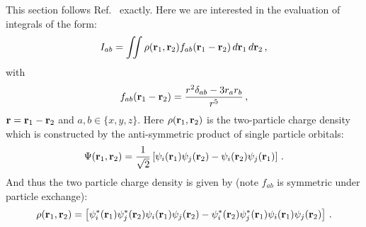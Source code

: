 This section follows Ref.~\cite{rayson2008first} exactly. Here we are interested in the evaluation of integrals of the form:
\begin{align}
    I_{ab}=\iint\rho(\mathbf{r}_1,\mathbf{r}_2)f_{ab}(\mathbf{r}_1-\mathbf{r}_2)\, d\mathbf{r}_1\, d\mathbf{r}_2 \, ,
    \label{zfs:eq:8}
\end{align}
with
\begin{align}
    f_{ab}(\mathbf{r}_1-\mathbf{r}_2)=\frac{r^2\delta_{ab}-3r_ar_b}{r^5} \, ,
    \label{zfs:eq:9}
\end{align}
$\mathbf{r}=\mathbf{r}_1-\mathbf{r}_2$ and $a,b \in \{x,y,z\}$. Here $\rho(\mathbf{r}_1,\mathbf{r}_2)$ is the two-particle charge density which is constructed by the anti-symmetric product of single particle orbitals:
\begin{align}
    \Psi(\mathbf{r}_1,\mathbf{r}_2)=\frac{1}{\sqrt{2}}\left[ \psi_i(\mathbf{r}_1)\psi_j(\mathbf{r}_2) - \psi_i(\mathbf{r}_2)\psi_j(\mathbf{r}_1) \right] \, .
    \label{zfs:eq:10}
\end{align}
And thus the two particle charge density is given by (note $f_{ab}$ is symmetric under particle exchange):
\begin{align}
    \rho(\mathbf{r}_1,\mathbf{r}_2)=\left[
    \psi_i^*(\mathbf{r}_1)\psi_j^*(\mathbf{r}_2)\psi_i(\mathbf{r}_1)\psi_j(\mathbf{r}_2) - \psi_i^*(\mathbf{r}_2)\psi_j^*(\mathbf{r}_1)\psi_i(\mathbf{r}_1)\psi_j(\mathbf{r}_2) \right] \, .
    \label{zfs:eq:11}
\end{align}

